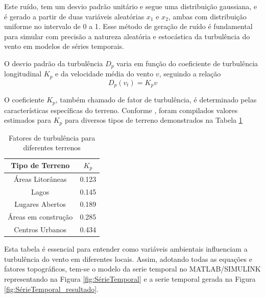 Este ruído, tem um desvio padrão unitário e segue uma distribuição gaussiana, e é gerado a partir de duas variáveis aleatórias \(x_1\) e \(x_2\), ambas com distribuição uniforme no intervalo de 0 a 1. Esse método de geração de ruído é fundamental para simular com precisão a natureza aleatória e estocástica da turbulência do vento em modelos de séries temporais.

O desvio padrão da turbulência \(D_p\) varia em função do coeficiente de turbulência longitudinal \(K_p\) e da velocidade média do vento \(v\), seguindo a relação
\begin{equation}
D_p(v_t) = K_p v
\end{equation}

O coeficiente \(K_p\), também chamado de fator de turbulência, é determinado pelas características específicas do terreno. Conforme , foram compilados valores estimados para \(K_p\) para diversos tipos de terreno demonstrados na Tabela \ref{tab:fator de turbulencia}

    \begin{table}[h]
        \caption{Fatores de turbulência para diferentes terrenos}
        \centering
        \begin{tabular}{c|c}
        \hline
        Tipo de Terreno & \(K_p\) \\
        \hline
        Áreas Litorâneas & 0.123 \\
        Lagos & 0.145 \\
        Lugares Abertos & 0.189 \\
        Áreas em construção & 0.285 \\
        Centros Urbanos & 0.434 \\
        \hline
        \end{tabular}
        \label{tab:fator de turbulencia}
    \end{table}

\par Esta tabela é essencial para entender como variáveis ambientais influenciam a turbulência do vento em diferentes locais. Assim, adotando todas as equações e fatores topográficos, tem-se o modelo da serie temporal no MATLAB/SIMULINK representando na Figura \ref{fig:SérieTemporal} e a serie temporal gerada na Figura \ref{fig:SérieTemporal_resultado}.

